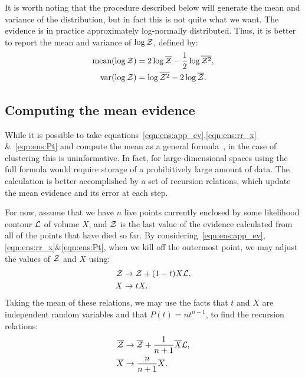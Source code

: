 It is worth noting that the procedure described below will generate the mean and variance of the distribution, but in fact this is not quite what we want. The evidence is in practice approximately log-normally distributed. Thus, it is better to report the mean and variance of $\log\mathcal{Z}$, defined by:
\begin{align}
  \text{mean}(\log\mathcal{Z}) &= 2\log\overline{\mathcal{Z}} - \frac{1}{2}\log\overline{\mathcal{Z}^2},\\
  \text{var}(\log\mathcal{Z}) &= \log\overline{\mathcal{Z}^2}-2\log\overline{\mathcal{Z}}.
\end{align}


\subsection{Computing the mean evidence}
\label{sec:ens:basic_mean}

While it is possible to take equations~\eqref{eqn:ens:app_ev},\ref{eqn:ens:rr_x} \&~\ref{eqn:ens:Pt} and compute the mean as a general formula~\citep{Keeton}, in the case of clustering this is uninformative. 
In fact, for large-dimensional spaces using the full formula would require storage of a prohibitively large amount of data. The calculation is better accomplished by a set of recursion relations, which update the mean evidence and its error at each step. 

For now, assume that we have $n$ live points currently enclosed by some likelihood contour $\mathcal{L}$ of volume $X$, and $\mathcal{Z}$ is the last value of the evidence calculated from all of the points that have died so far. By considering~\eqref{eqn:ens:app_ev},\ref{eqn:ens:rr_x}\&\ref{eqn:ens:Pt}, when we kill off the outermost point, we may adjust the values of $\mathcal{Z}$ and $X$ using:
%
\begin{align}                                                         
\mathcal{Z} &\to \mathcal{Z} + (1-t)X\mathcal{L},
\label{eqn:ens:rr_Z}
\\
X &\to tX.
\label{eqn:ens:rr_X}
\end{align}
%
Taking the mean of these relations, we may use the facts that $t$ and $X$ are independent random variables and that $P(t) = n t^{n-1}$, to find the recursion relations:
\begin{align}
  \overline{\mathcal{Z}} &\to \overline{\mathcal{Z}} + \frac{1}{n+1}\overline{X}\mathcal{L},
  \label{eqn:ens:rr_Zb}
  \\
  \overline{X} &\to \frac{n}{n+1}\overline{X}.
  \label{eqn:ens:rr_Xb}
\end{align}
%

